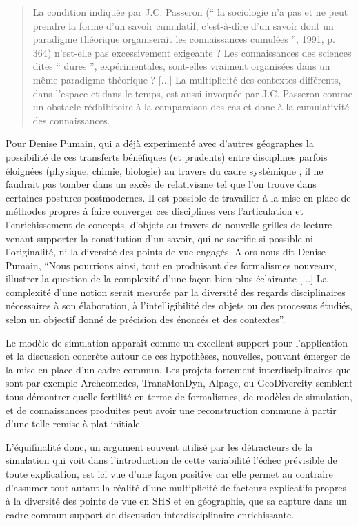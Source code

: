 \blockquote[\cite{Pumain2005}]{La condition indiquée par J.C. Passeron (\enquote{ la sociologie n’a pas et ne peut prendre la forme d’un savoir cumulatif, c’est-à-dire d’un savoir dont un paradigme théorique organiserait les connaissances cumulées }, 1991, p. 364) n’est-elle pas excessivement exigeante ? Les connaissances des sciences dites \enquote{ dures }, expérimentales, sont-elles vraiment organisées dans un même paradigme théorique ? [...] La multiplicité des contextes différents, dans l’espace et dans le temps, est aussi invoquée par J.C. Passeron comme un obstacle rédhibitoire à la comparaison des cas et donc à la cumulativité des connaissances.}

Pour Denise Pumain, qui a déjà experimenté avec d'autres géographes la possibilité de ces transferts bénéfiques (et prudents) entre disciplines parfois éloignées (physique, chimie, biologie) au travers du cadre systémique \autocites{Pumain1989,Sanders1992, Dastes1998}, il ne faudrait pas tomber dans un excès de relativisme tel que l'on trouve dans certaines postures postmodernes. Il est possible de travailler à la mise en place de méthodes  propres à faire converger ces disciplines vers l'articulation et l'enrichissement de concepts, d'objets au travers de nouvelle grilles de lecture venant supporter la constitution d'un savoir, qui ne sacrifie si possible ni l'originalité, ni la diversité des points de vue engagés. Alors nous dit Denise Pumain, \enquote{Nous pourrions ainsi, tout en produisant des formalismes nouveaux, illustrer la question de la complexité d’une façon bien plus éclairante [...] La complexité d’une notion serait mesurée par la diversité des regards disciplinaires nécessaires à son élaboration, à l’intelligibilité des objets ou des processus étudiés, selon un objectif donné de précision des énoncés et des contextes}.

Le modèle de simulation apparaît comme un excellent support pour l'application et la discussion concrète autour de ces hypothèses, nouvelles, pouvant émerger de la mise en place d'un cadre commun. Les projets fortement interdisciplinaires que sont par exemple Archeomedes, TransMonDyn, Alpage, ou GeoDivercity \autocite{Chapron2014} semblent tous démontrer quelle fertilité en terme de formalismes, de modèles de simulation, et de connaissances produites peut avoir une reconstruction commune à partir d'une telle remise à plat initiale.

L'équifinalité donc, un argument souvent utilisé par les détracteurs de la simulation qui voit dans l'introduction de cette variabilité l'échec prévisible de toute explication, est ici vue d'une façon positive car elle permet au contraire d'assumer tout autant la réalité d'une multiplicité de facteurs explicatifs propres à la diversité des points de vue en SHS et en géographie, que sa capture dans un cadre commun support de discussion interdisciplinaire enrichissante.

